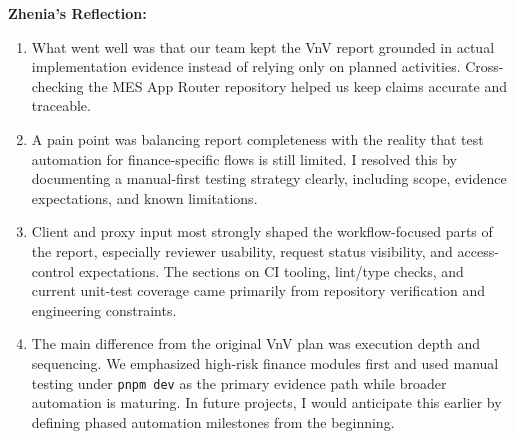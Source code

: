 \documentclass[12pt, titlepage]{article}
\begin{document}
\noindent\textbf{Zhenia's Reflection:}
\begin{enumerate}
\item What went well was that our team kept the VnV report grounded in actual implementation evidence instead of relying only on planned activities. Cross-checking the MES App Router repository helped us keep claims accurate and traceable.

\item A pain point was balancing report completeness with the reality that test automation for finance-specific flows is still limited. I resolved this by documenting a manual-first testing strategy clearly, including scope, evidence expectations, and known limitations.

\item Client and proxy input most strongly shaped the workflow-focused parts of the report, especially reviewer usability, request status visibility, and access-control expectations. The sections on CI tooling, lint/type checks, and current unit-test coverage came primarily from repository verification and engineering constraints.

\item The main difference from the original VnV plan was execution depth and sequencing. We emphasized high-risk finance modules first and used manual testing under \texttt{pnpm dev} as the primary evidence path while broader automation is maturing. In future projects, I would anticipate this earlier by defining phased automation milestones from the beginning.
\end{enumerate}
\end{document}
